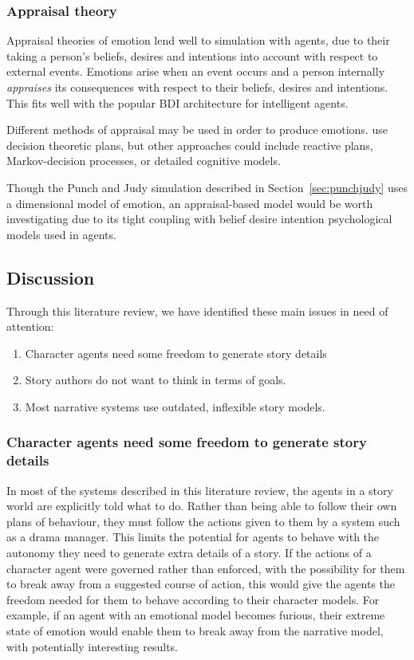 \documentclass[11pt]{report}
\begin{document}
\subsubsection{Appraisal theory}
Appraisal theories of emotion lend well to simulation with agents, due to their taking a person's beliefs, desires and intentions into account with respect to external events. Emotions arise when an event occurs and a person internally \emph{appraises} its consequences with respect to their beliefs, desires and intentions. This fits well with the popular BDI architecture for intelligent agents.

Different methods of appraisal may be used in order to produce emotions. \citet{gratch2004domain} use decision theoretic plans, but other approaches could include reactive plans, Markov-decision processes, or detailed cognitive models.

Though the Punch and Judy simulation described in Section~\ref{sec:punchjudy}
uses a dimensional model of emotion, an appraisal-based model would be worth
investigating due to its tight coupling with belief desire intention
psychological models used in agents.

\subsection{Discussion}\label{sec:litrev-discussion}
Through this literature review, we have identified these main issues in
need of attention:

\begin{enumerate}[{Issue} 1:]
\item\label{iss:freedom} Character agents need some freedom to generate story details
\item\label{iss:goals} Story authors do not want to think in terms of goals.
\item\label{iss:models} Most narrative systems use outdated, inflexible story models.
\end{enumerate}

\subsubsection{Character agents need some freedom to generate story details}
In most of the systems described in this literature review, the agents in a
story world are explicitly told what to do. Rather than being able to follow
their own plans of behaviour, they must follow the actions given to them by a
system such as a drama manager. This limits the potential for agents to behave
with the autonomy they need to generate extra details of a story. If the actions
of a character agent were governed rather than enforced, with the possibility
for them to break away from a suggested course of action, this would give the
agents the freedom needed for them to behave according to their character
models. For example, if an agent with an emotional model becomes furious, their
extreme state of emotion would enable them to break away from the narrative
model, with potentially interesting results.
\end{document}
